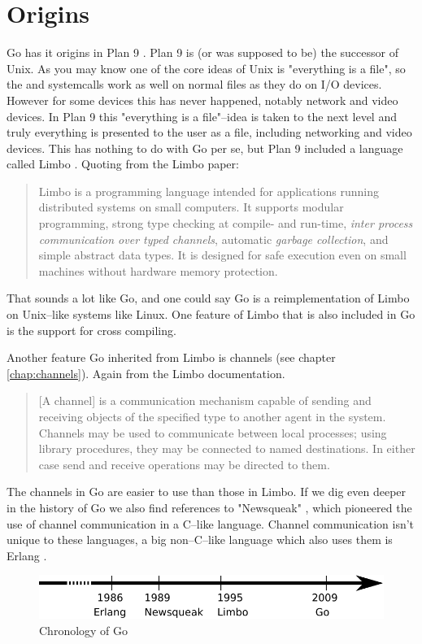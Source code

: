 \section{Origins}
Go has it origins in Plan 9 \cite{plan9}. Plan 9 is (or was 
supposed to be) the successor of Unix. As you may know one of the
core ideas of Unix is "everything is a file", so the  and
 systemcalls work as well on normal files as they do on I/O
devices. However for some devices this has never happened, notably
network and video devices. In Plan 9 this "everything is a file"--idea
is taken to the next level and truly everything is presented to the 
user as a file, including networking and video devices. This has nothing
to do with Go per se, but Plan 9 included a language called Limbo
\cite{limbo}. Quoting from the Limbo paper:
\begin{quote}
Limbo is a programming language intended for applications running
distributed systems on small computers. It supports modular programming,
strong type checking at compile- and run-time, \emph{inter process
communication over typed channels}, automatic \emph{garbage collection}, and
simple abstract data types. It is designed for safe execution even on
small machines without hardware memory protection.
\end{quote}
That sounds a lot like Go, and one could say Go is a reimplementation of
Limbo on Unix--like systems like Linux. One feature of Limbo that is
also included in Go is the support for cross compiling.

Another feature Go inherited from Limbo is channels (see chapter
\ref{chap:channels}). Again from the Limbo documentation.
\begin{quote}
[A channel] is a communication mechanism capable of sending and receiving objects of
the specified type to another agent in the system. Channels may be used
to communicate between local processes; using library procedures, they
may be connected to named destinations. In either case send and receive
operations may be directed to them.
\end{quote}
The channels in Go are easier to use than those in Limbo.
If we dig even deeper in the history of Go we also find references
to "Newsqueak" \cite{newsqueak}, which pioneered the use of 
channel communication in a C--like language. Channel
communication isn't unique to these languages, a big non--C--like
language which also uses them is Erlang \cite{erlang}.

\begin{figure}[H]
\caption{Chronology of Go}
\label{fig:chrono-of-go}
\begin{center}
\includegraphics[scale=0.65]{fig/go-history.pdf}
\end{center}
\end{figure}

